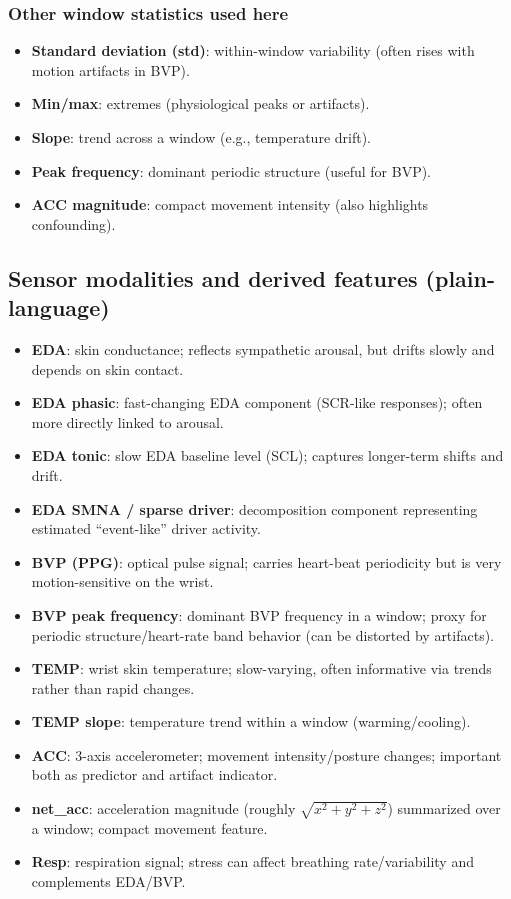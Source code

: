 \documentclass[11pt]{article}
\begin{document}
\subsubsection*{Other window statistics used here}
\begin{itemize}
  \item \textbf{Standard deviation (std)}: within-window variability (often rises with motion artifacts in BVP).
  \item \textbf{Min/max}: extremes (physiological peaks or artifacts).
  \item \textbf{Slope}: trend across a window (e.g., temperature drift).
  \item \textbf{Peak frequency}: dominant periodic structure (useful for BVP).
  \item \textbf{ACC magnitude}: compact movement intensity (also highlights confounding).
\end{itemize}

\subsection{Sensor modalities and derived features (plain-language)}
\begin{itemize}
  \item \textbf{EDA}: skin conductance; reflects sympathetic arousal, but drifts slowly and depends on skin contact.
  \item \textbf{EDA phasic}: fast-changing EDA component (SCR-like responses); often more directly linked to arousal.
  \item \textbf{EDA tonic}: slow EDA baseline level (SCL); captures longer-term shifts and drift.
  \item \textbf{EDA SMNA / sparse driver}: decomposition component representing estimated ``event-like'' driver activity.
  \item \textbf{BVP (PPG)}: optical pulse signal; carries heart-beat periodicity but is very motion-sensitive on the wrist.
  \item \textbf{BVP peak frequency}: dominant BVP frequency in a window; proxy for periodic structure/heart-rate band behavior (can be distorted by artifacts).
  \item \textbf{TEMP}: wrist skin temperature; slow-varying, often informative via trends rather than rapid changes.
  \item \textbf{TEMP slope}: temperature trend within a window (warming/cooling).
  \item \textbf{ACC}: 3-axis accelerometer; movement intensity/posture changes; important both as predictor and artifact indicator.
  \item \textbf{net\_acc}: acceleration magnitude (roughly $\sqrt{x^2+y^2+z^2}$) summarized over a window; compact movement feature.
  \item \textbf{Resp}: respiration signal; stress can affect breathing rate/variability and complements EDA/BVP.
\end{itemize}
\end{document}
